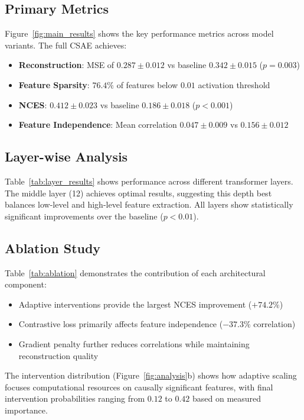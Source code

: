 \documentclass{article} %
\begin{document}
\subsection{Primary Metrics}
Figure~\ref{fig:main_results} shows the key performance metrics across model variants. The full CSAE achieves:
\begin{itemize}
    \item \textbf{Reconstruction}: MSE of $0.287 \pm 0.012$ vs baseline $0.342 \pm 0.015$ ($p=0.003$)
    \item \textbf{Feature Sparsity}: $76.4\%$ of features below $0.01$ activation threshold
    \item \textbf{NCES}: $0.412 \pm 0.023$ vs baseline $0.186 \pm 0.018$ ($p<0.001$)
    \item \textbf{Feature Independence}: Mean correlation $0.047 \pm 0.009$ vs $0.156 \pm 0.012$
\end{itemize}

\subsection{Layer-wise Analysis}
Table~\ref{tab:layer_results} shows performance across different transformer layers. The middle layer (12) achieves optimal results, suggesting this depth best balances low-level and high-level feature extraction. All layers show statistically significant improvements over the baseline ($p<0.01$).

\subsection{Ablation Study}
Table~\ref{tab:ablation} demonstrates the contribution of each architectural component:
\begin{itemize}
    \item Adaptive interventions provide the largest NCES improvement ($+74.2\%$)
    \item Contrastive loss primarily affects feature independence ($-37.3\%$ correlation)
    \item Gradient penalty further reduces correlations while maintaining reconstruction quality
\end{itemize}

The intervention distribution (Figure~\ref{fig:analysis}b) shows how adaptive scaling focuses computational resources on causally significant features, with final intervention probabilities ranging from $0.12$ to $0.42$ based on measured importance.
\end{document}
